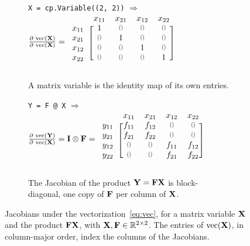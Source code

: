 \begin{figure}[htbp]
\begin{subfigure}{\textwidth}
\centering
\texttt{X = cp.Variable((2, 2))}
\qquad$\Longrightarrow$\qquad
$
\frac{\partial\,\vect(\mmat{X})}{\partial\,\vect(\mmat{X})} =
\begin{blockarray}{ccccc}
       & x_{11}    & x_{21}    & x_{12}    & x_{22}    \\
\begin{block}{c[cccc]}
x_{11} & 1         & \plotzero & \plotzero & \plotzero \\
x_{21} & \plotzero & 1         & \plotzero & \plotzero \\
x_{12} & \plotzero & \plotzero & 1         & \plotzero \\
x_{22} & \plotzero & \plotzero & \plotzero & 1         \\
\end{block}
\end{blockarray}
$
\caption{A matrix variable is the identity map of its own entries.}
\label{fig:vec-variable-identity}
\end{subfigure}
\vspace{3ex}

\begin{subfigure}{\textwidth}
\centering
\texttt{Y = F @ X}
\qquad$\Longrightarrow$\qquad
$
\frac{\partial\,\vect(\mmat{Y})}{\partial\,\vect(\mmat{X})} = \mmat{I} \otimes \mmat{F} =
\begin{blockarray}{ccccc}
       & x_{11}    & x_{21}    & x_{12}    & x_{22}    \\
\begin{block}{c[cccc]}
y_{11} & f_{11}    & f_{12}    & \plotzero & \plotzero \\
y_{21} & f_{21}    & f_{22}    & \plotzero & \plotzero \\
y_{12} & \plotzero & \plotzero & f_{11}    & f_{12}    \\
y_{22} & \plotzero & \plotzero & f_{21}    & f_{22}    \\
\end{block}
\end{blockarray}
$
\caption{The Jacobian of the product $\mathbf{Y} = \mathbf{F}\mathbf{X}$ is block-diagonal, one copy
of $\mathbf{F}$ per column of $\mathbf{X}$.}
\label{fig:vec-variable-kron}
\end{subfigure}
\caption{Jacobians under the vectorization~\eqref{eq:vec}, for a matrix variable $\mathbf{X}$ and
the product $\mathbf{F}\mathbf{X}$,
with
$\mathbf{X}, \mathbf{F} \in \mathbb{R}^{2 \times 2}$. The entries of $\mathop{\mathrm{vec}}(\mathbf{X})$, in column-major
order, index the
columns of the Jacobians.}
\label{fig:vec-variable}
\end{figure}

